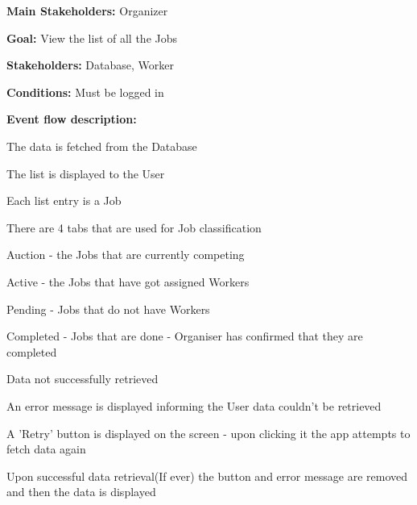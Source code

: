 				\noindent {}
				\begin{packed_item}
					\item \textbf{Main Stakeholders:} Organizer
					\item \textbf{Goal:} View the list of all the Jobs
					\item \textbf{Stakeholders: } Database, Worker
					\item \textbf{Conditions: } Must be logged in
					\item \textbf{Event flow description: }
					\begin{packed_enum}
						\item The data is fetched from the Database
						\item The list is displayed to the User
						\item Each list entry is a Job
						\item There are 4 tabs that are used for Job classification
						\item[] \begin{packed_enum}
							\item Auction - the Jobs that are currently competing
							\item Active - the Jobs that have got assigned Workers
							\item Pending - Jobs that do not have Workers
							\item Completed - Jobs that are done - Organiser has confirmed that they are completed
						\end{packed_enum}
					\end{packed_enum}
					
					\begin{packed_item}
						\item[0.a] Data not successfully retrieved
						\item[] \begin{packed_enum}
							\item An error message is displayed informing the User data couldn't be retrieved
							\item A 'Retry' button is displayed on the screen - upon clicking it the app attempts to fetch data again
							\item Upon successful data retrieval(If ever) the button and error message are removed and then the data is displayed
						\end{packed_enum}
					\end{packed_item}
				\end{packed_item}
			
